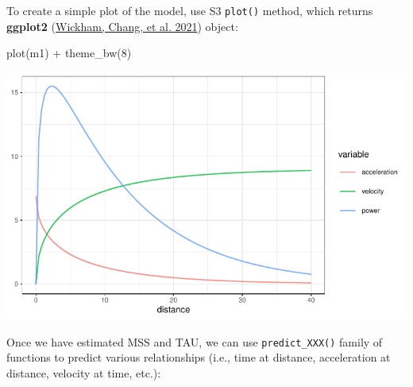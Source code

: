 \documentclass[fleqn,10pt]{wlpeerj} %
\newenvironment{Shaded}{\begin{snugshade}}{\end{snugshade}}
\newcommand{\AttributeTok}[1]{\textcolor[rgb]{0.77,0.63,0.00}{#1}}
\newcommand{\CommentTok}[1]{\textcolor[rgb]{0.56,0.35,0.01}{\textit{#1}}}
\newcommand{\DecValTok}[1]{\textcolor[rgb]{0.00,0.00,0.81}{#1}}
\newcommand{\FunctionTok}[1]{\textcolor[rgb]{0.00,0.00,0.00}{#1}}
\newcommand{\NormalTok}[1]{#1}
\newcommand{\SpecialCharTok}[1]{\textcolor[rgb]{0.00,0.00,0.00}{#1}}
\begin{document}
To create a simple plot of the model, use S3 \texttt{plot()} method, which returns \textbf{ggplot2} (\protect\hyperlink{ref-R-ggplot2}{Wickham, Chang, et al. 2021}) object:

\small

\begin{Shaded}
\begin{Highlighting}[]
\FunctionTok{plot}\NormalTok{(m1) }\SpecialCharTok{+} \FunctionTok{theme\_bw}\NormalTok{(}\DecValTok{8}\NormalTok{)}
\end{Highlighting}
\end{Shaded}

\begin{center}\includegraphics[width=0.9\linewidth]{paper_files/figure-latex/unnamed-chunk-2-1} \end{center}

\normalsize

Once we have estimated MSS and TAU, we can use \texttt{predict\_XXX()} family of functions to predict various relationships (i.e., time at distance, acceleration at distance, velocity at time, etc.):

\small

\begin{Shaded}
\end{Shaded}
\end{document}
